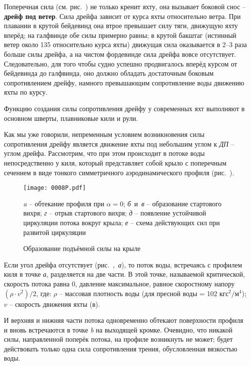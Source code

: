Поперечная сила  (см. рис.~)
не только кренит яхту, она вызывает боковой снос \---
\textbf{дрейф под ветер}. Сила дрейфа зависит от курса яхты
относительно ветра. При плавании в крутой бейдевинд она втрое
превышает силу тяги, движущую яхту вперёд; на галфвинде обе силы
примерно равны; в крутой бакштаг (истинный ветер около 135\gr
относительно курса яхты) движущая сила оказывается в 2--3 раза больше
силы дрейфа, а на чистом фордевинде сила дрейфа вовсе
отсутствует. Следовательно, для того чтобы судно успешно продвигалось
вперёд курсом от бейдевинда до галфвинда, оно должно обладать
достаточным боковым сопротивлением дрейфу, намного превышающим
сопротивление воды движению яхты по курсу.

Функцию создания силы сопротивления дрейфу
у современных яхт выполняют в основном шверты, плавниковые кили и рули.

Как мы уже говорили, непременным условием возникновения силы
сопротивления дрейфу является движение яхты под небольшим углом к
\textit{ДП} \--- углом дрейфа. Рассмотрим, что при этом происходит в
потоке воды непосредственно у киля, который представляет собой крыло с
поперечным сечением в виде тонкого симметричного аэродинамического
профиля (рис.~).

\begin{figure*}[htb]
  \centering
  \texttt{[image: 0008P.pdf]}
  \caption{Образование подъёмной силы на крыле}
  \label{fig:8}
  \centering{}\small \textit{a} \--- обтекание профиля при $\alpha = 0$;
                     \textit{б}~и~\textit{в} \--- образование стартового вихря;
                     \textit{г} \--- отрыв стартового вихря;
                     \textit{д} \--- появление устойчивой циркуляции потока вокруг крыла;
                     \textit{е} \--- схема действующих сил при развитой циркуляции
\end{figure*}

Если угол дрейфа отсутствует (рис.~,~\textit{а}), то поток
воды, встречаясь с профилем киля в точке \textit{а}, разделяется на
две части. В этой точке, называемой критической, скорость потока равна
0, давление максимальное, равное скоростному напору
$(\rho \cdot v^2) / 2$, где: $\rho$ \--- массовая плотность воды (для
пресной воды = 102 $\text{кгс}^2 / \text{м}^4$); $v$ \--- скорость
движения яхты (в\speedms).

И верхняя и нижняя части потока одновременно обтекают поверхности
профиля и вновь встречаются в точке \textit{b} на выходящей
кромке. Очевидно, что никакой силы, направленной поперёк потока, на
профиле возникнуть не может; будет действовать только одна сила
сопротивления трения, обусловленная вязкостью воды.


